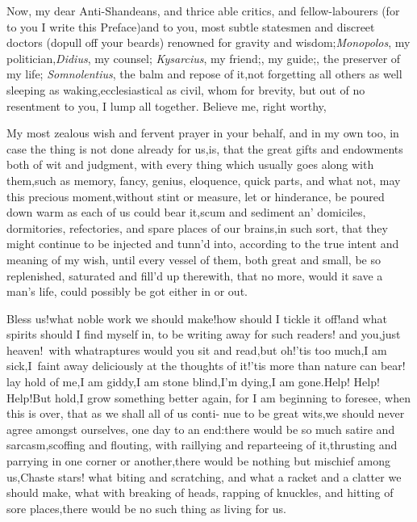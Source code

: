 \documentclass{article}
\begin{document}
\vspace{-\parskip}
Now, my dear Anti-Shandeans, and\break
thrice able critics, and
fellow-labourers (for to you I write this Preface)\tsh and
to you, most subtle statesmen and discreet doctors (do\tsk pull
off your beards) renowned for gravity and
wisdom;\tsh \textit{Monopolos}, my
politician,\tsk \textit{Didius}, my counsel; \textit{Kysarcius}, my
friend;\tsk {}, my
guide;\tsk {}, the preserv\-er of my life;
\textit{Somnolentius}, the balm and repose of it,\tsk not
forgetting all others as well sleeping as waking,\tsk ecclesiastical
as civil, whom for brevity, but out of no
resentment to you, I lump all together.\break
\tsh Believe me, right worthy,

My most zealous wish and fervent\break
prayer in your behalf, and in my own\break
too, in case the thing is not done already\break
for us,\tsh is, that the great gifts and endowments both of wit
and judgment, with every thing which usually goes al\-ong with
them,\tsh such as memory, fan\-cy, genius, eloquence, quick
parts, and what not, may this precious moment,\break without stint or
measure, let or hinderance, be poured down warm as each of us could
bear it,\tsk scum and sediment an’\break
{}
domiciles, dormitories, refectories, and spare places of our
brains,\tsh in such sort, that they might continue to be
injected and tunn’d into, according to the true intent
and meaning of my wish, until\break
every vessel of them, both great and\break
small, be so replenished, saturated and\break
fill’d up therewith, that no more, would it save a man’s life, could possibly be
got either in or out.

Bless us!\tsk what noble work we should make!\tsh how
should I tickle it off!\break\tsh and what spirits should I find
myself in, to be writing away for such readers!\break
\tsk and you,\tsk just heaven!\tsk\  with what\break raptures would you
sit and read,\tsk but oh!\tsk ’tis too much,\tsh I
am sick,\tsh I~faint away deliciously at the thoughts of
it!\tsk ’tis more than nature can bear!\break
\tsk lay hold of
me,\tsh I am giddy,\tsk I am stone blind,\tsk I’m
dying,\tsk I am gone.\tsh Help! Help! Help!\tsh But
hold,\tsk I grow something better again, for I am beginning to
foresee, when this is over, that as we shall all of us conti-
nue to
be great wits,\tsk we should never agree amongst ourselves, one
day to an end:\tsh there would be so much satire and
sarcasm,\tsh scoffing and flouting, with raillying and
reparteeing of it,\tsk thrusting
and parrying in one corner or another,\tsh there would be
nothing but mischief among us,\tsk Chaste stars! what
biting and scratching, and what a racket and a clatter we should
make, what with breaking of heads, rapping of knuckles, and hitting
of sore places,\tsk there would be no such thing as living for
us.
\end{document}
